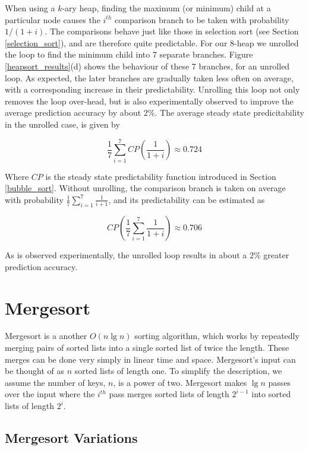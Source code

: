 \documentclass[acmtocl]{acmtrans2m}
\begin{document}
When using a $k$-ary heap, finding the maximum (or minimum) child at a particular node causes the $i^{th}$ comparison branch to be taken
with probability $1/(1 + i)$. The comparisons behave just like those in selection sort (see Section \ref{selection_sort}), and are therefore quite
predictable.  For our 8-heap we unrolled the
loop to find the minimum child into 7 separate branches. 
Figure \ref{heapsort_results}(d) shows the behaviour of these 7 branches, for an unrolled loop.
As expected, the later branches are gradually taken less often on average, with a corresponding increase in their predictability.
Unrolling this loop
not only removes the loop over-head, but is also experimentally observed to improve the average prediction accuracy by about 2\%. 
The average steady state predicitability in the unrolled case, is given by

\[
\frac{1}{7}\sum^7_{i=1}CP\left(\frac{1}{1 + i}\right) \approx 0.724
\]

\noindent
Where $CP$ is the steady state predictability function introduced in Section \ref{bubble_sort}.
Without unrolling, the comparison branch is taken on average with probability $\frac{1}{7}\sum^7_{i=1}\frac{1}{i + 1}$, and its predictability
can be estimated as

\[
CP\left(\frac{1}{7}\sum^7_{i=1}\frac{1}{1 + i} \right) \approx 0.706
\]

\noindent
As is observed experimentally, the unrolled loop results in about a 2\% greater prediction accuracy.

\section{Mergesort}
\label{mergesort}

Mergesort \cite{KnuthVol3_98} is a another $O(n \lg n)$ sorting algorithm, which works by 
repeatedly merging pairs of sorted lists into a single sorted list of twice the length. These merges can
be done very simply in linear time and space. Mergesort's
input can be thought of as $n$ sorted lists of length one. To simplify the description, we 
assume the number of keys, $n$, is a power of two. Mergesort makes $\lg n$
passes over the input where the $i^{th}$ pass merges sorted lists of length $2^{i - 1}$ into 
sorted lists of length $2^i$. 

\subsection{Mergesort Variations}
\label{mergesort_variations}
\end{document}
